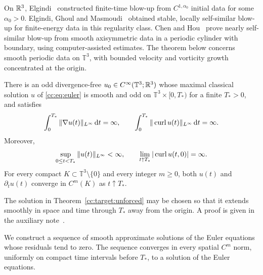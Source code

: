 On $\mathbb R^3$, Elgindi~\cite{ElgindiSingularity} constructed finite-time
blow-up from $C^{1,\alpha_0}$ initial data for some $\alpha_0>0$.
Elgindi, Ghoul and Masmoudi~\cite{ElgindiGhoulMasmoudi} obtained stable,
locally self-similar blow-up for finite-energy data in this regularity class.
Chen and Hou~\cite{ChenHouSmoothI,ChenHouSmoothII} prove nearly self-similar
blow-up from smooth axisymmetric data in a periodic cylinder with boundary,
using computer-assisted estimates. The theorem below concerns smooth
periodic data on $\mathbb T^3$, with bounded velocity and vorticity growth
concentrated at the origin.

\begin{theorem}\label{cc:target:unforced}
There is an odd divergence-free
$u_0\in C^\infty(\mathbb T^3;\mathbb R^3)$ whose maximal classical solution $u$
of \eqref{cc:eq:euler} is smooth and odd on
$\mathbb T^3\times[0,T_*)$ for a finite $T_*>0$, and satisfies
\begin{equation}\label{cc:uf:eq:main-breakdown}
 \int_0^{T_*}\|\nabla u(t)\|_{L^\infty}\,\mathrm d t=\infty,
 \qquad
 \int_0^{T_*}\|\operatorname{curl} u(t)\|_{L^\infty}\,\mathrm d t=\infty.
\end{equation}
Moreover,
\begin{equation}\label{cc:uf:eq:main-terminal}
 \sup_{0\le t<T_*}\|u(t)\|_{L^\infty}<\infty,
 \qquad \lim_{t\uparrow T_*}|\operatorname{curl} u(t,0)|=\infty.
\end{equation}
For every compact $K\subset\mathbb T^3\setminus\{0\}$ and every integer
$m\ge0$, both $u(t)$ and $\partial_tu(t)$ converge in $C^m(K)$ as
$t\uparrow T_*$.
\end{theorem}

\begin{remark}
The solution in Theorem~\ref{cc:target:unforced} may be chosen so that it
extends smoothly in space and time through $T_*$ away from the origin.
A proof is given in the auxiliary note~\cite{TerminalSmoothness}.
\end{remark}

We construct a sequence of smooth approximate solutions of the Euler
equations whose residuals tend to zero. The sequence converges in every
spatial $C^m$ norm, uniformly on compact time intervals before $T_*$, to
a solution of the Euler equations.


